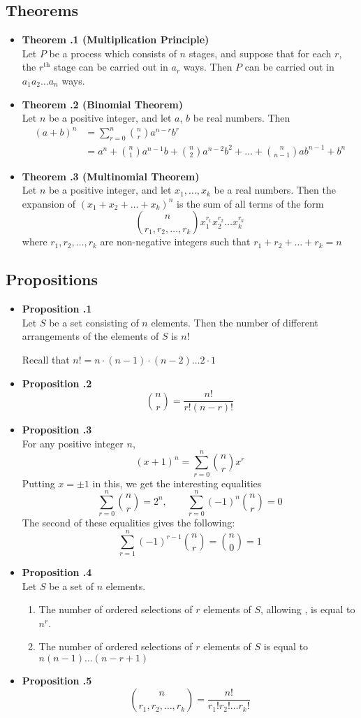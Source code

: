 \documentclass[a4paper,12pt]{article}
\newcommand{\prop}[1]{
    \item \textbf{Proposition \thesection.#1}\\
}
\newcommand{\theo}[1]{
    \item \textbf{Theorem \thesection.#1}\\
}
\let\emph\relax %
\begin{document}
\subsection{Theorems}
\begin{itemize}
    \theo {1 (Multiplication Principle)}
    Let $P$ be a process which consists of $n$ stages, and suppose that for
    each $r$, the $r^\text{th}$ stage can be carried out in $a_r$ ways. Then
    $P$ can be carried out in $a_1a_2 \ldots a_n$ ways.
    
    \theo {2 (Binomial Theorem)}
    Let $n$ be a positive integer, and let $a$, $b$ be real numbers. Then
    \begin{align*}
        (a + b)^n &= \sum^n_{r=0} \binom{n}{r} a^{n-r}b^r\\
                  &= a^n + \binom{n}{1}a^{n-1}b + \binom{n}{2}a^{n-2}b^2 + \ldots + \binom{n}{n-1}ab^{n-1} + b^n
    \end{align*}
    
    \theo {3 (Multinomial Theorem)}
    Let $n$ be a positive integer, and let $x_1, \ldots, x_k$ be a real
    numbers. Then the expansion of $(x_1 + x_2 + \ldots + x_k)^n$ is the sum of
    all terms of the form
        $$ \binom{n}{r_1, r_2, \ldots, r_k} x_1^{r_1}x_2^{r_2} \ldots x_k^{r_k} $$
    where $r_1, r_2, \ldots, r_k$ are non-negative integers such that
    $r_1 + r_2 + \ldots + r_k = n$
\end{itemize}

\subsection{Propositions}
\begin{itemize}
    \prop 1
    Let $S$ be a set consisting of $n$ elements. Then the number of different
    arrangements of the elements of $S$ \emph{in order} is $n!$
    
    Recall that $n! = n \cdot (n-1) \cdot (n-2) \ldots 2 \cdot 1$
    
    \prop 2
        $$ \binom{n}{r} = \frac{n!}{r!(n-r)!} $$
        
    \prop 3
    For any positive integer $n$,
        $$ (x + 1)^n = \sum^n_{r=0} \binom{n}{r} x^r $$
    Putting $x = \pm1$ in this, we get the interesting equalities
        $$ \sum^n_{r=0} \binom{n}{r} = 2^n, \qquad \sum^n_{r=0} (-1)^n \binom{n}{r} = 0 $$
    The second of these equalities gives the following:
        $$ \sum^n_{r=1} (-1)^{r-1} \binom{n}{r} = \binom{n}{0} = 1 $$
    
    \prop 4
    Let $S$ be a set of $n$ elements.
    \begin{enumerate}
        \item The number of ordered selections of $r$ elements of $S$, allowing
            \emph{repetitions}, is equal to $n^r$.
        \item The number of ordered selections of $r$ \emph{distinct} elements
            of $S$ is equal to $n (n - 1) \ldots (n - r + 1)$
    \end{enumerate}
    
    \prop 5
        $$ \binom{n}{r_1, r_2, \ldots, r_k} = \frac{n!}{r_1!r_2! \ldots r_k!} $$
\end{itemize}
\end{document}
